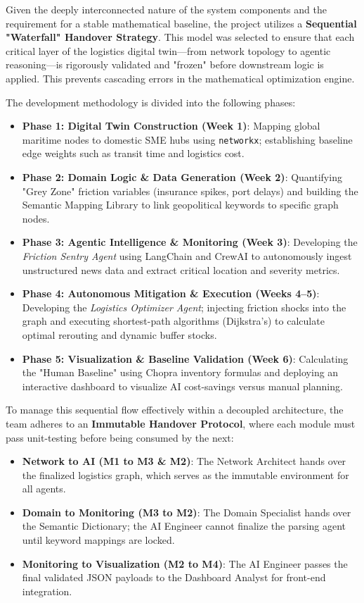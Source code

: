 Given the deeply interconnected nature of the system components and the requirement for a stable mathematical baseline, the project utilizes a \textbf{Sequential "Waterfall" Handover Strategy}. This model was selected to ensure that each critical layer of the logistics digital twin—from network topology to agentic reasoning—is rigorously validated and "frozen" before downstream logic is applied. This prevents cascading errors in the mathematical optimization engine.

The development methodology is divided into the following phases:

\begin{itemize}
    \item \textbf{Phase 1: Digital Twin Construction (Week 1)}: Mapping global maritime nodes to domestic SME hubs using \texttt{networkx}; establishing baseline edge weights such as transit time and logistics cost.
    \item \textbf{Phase 2: Domain Logic \& Data Generation (Week 2)}: Quantifying "Grey Zone" friction variables (insurance spikes, port delays) and building the Semantic Mapping Library to link geopolitical keywords to specific graph nodes.
    \item \textbf{Phase 3: Agentic Intelligence \& Monitoring (Week 3)}: Developing the \textit{Friction Sentry Agent} using LangChain and CrewAI to autonomously ingest unstructured news data and extract critical location and severity metrics.
    \item \textbf{Phase 4: Autonomous Mitigation \& Execution (Weeks 4--5)}: Developing the \textit{Logistics Optimizer Agent}; injecting friction shocks into the graph and executing shortest-path algorithms (Dijkstra's) to calculate optimal rerouting and dynamic buffer stocks.
    \item \textbf{Phase 5: Visualization \& Baseline Validation (Week 6)}: Calculating the "Human Baseline" using Chopra inventory formulas and deploying an interactive dashboard to visualize AI cost-savings versus manual planning.
\end{itemize}

To manage this sequential flow effectively within a decoupled architecture, the team adheres to an \textbf{Immutable Handover Protocol}, where each module must pass unit-testing before being consumed by the next:
\begin{itemize}
    \item \textbf{Network to AI (M1 to M3 \& M2)}: The Network Architect hands over the finalized logistics graph, which serves as the immutable environment for all agents.
    \item \textbf{Domain to Monitoring (M3 to M2)}: The Domain Specialist hands over the Semantic Dictionary; the AI Engineer cannot finalize the parsing agent until keyword mappings are locked.
    \item \textbf{Monitoring to Visualization (M2 to M4)}: The AI Engineer passes the final validated JSON payloads to the Dashboard Analyst for front-end integration.
\end{itemize}
